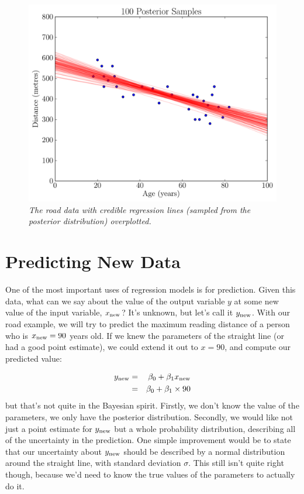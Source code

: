 \begin{figure}[!ht]
\begin{center}
\includegraphics[scale=0.5]{Figures/road_lines.pdf}
\caption{\it The road data with credible regression lines (sampled from the
posterior distribution) overplotted.\label{fig:road_lines}}
\end{center}
\end{figure}

\section{Predicting New Data}
One of the most important uses of regression models is for prediction. Given
this data, what can we say about the value of the output variable $y$ at some
new value of the input variable, $x_{\rm new}$? It's unknown, but let's call it
$y_{\rm new}$. With our road example, we will try to predict the maximum reading
distance of a person who is $x_{\rm new}=90$ years old.
If we knew the parameters of the straight line (or had a good point estimate),
we could extend it out to $x=90$, and compute our predicted value:

\begin{eqnarray}
y_{\rm new} &=& \beta_0 + \beta_1 x_{\rm new}\\
&=& \beta_0 + \beta_1\times 90
\end{eqnarray}
but that's not quite in the Bayesian spirit. Firstly, we don't know the value
of the parameters, we only have the posterior distribution. Secondly, we would
like not just a point estimate for $y_{\rm new}$ but a whole probability distribution,
describing all of the uncertainty in the prediction. One simple improvement
would be to state that our uncertainty about $y_{\rm new}$ should be described
by a normal distribution around the straight line, with standard deviation $\sigma$.
This still isn't quite right though, because we'd need to know the true values
of the parameters to actually do it.

